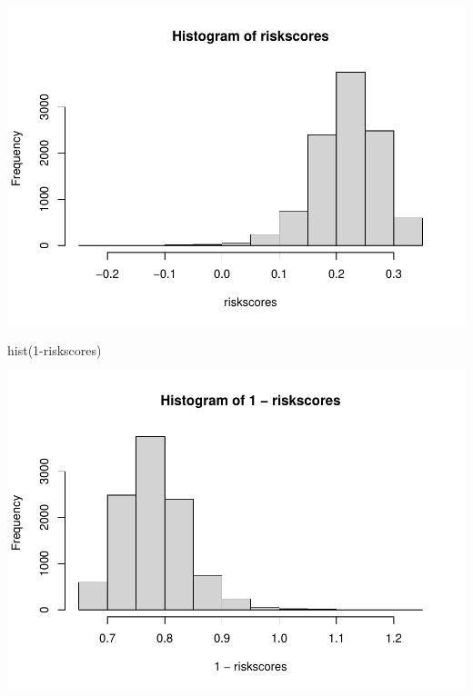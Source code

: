 \documentclass[
  11pt,
]{article}
\newenvironment{Shaded}{\begin{snugshade}}{\end{snugshade}}
\newcommand{\CommentTok}[1]{\textcolor[rgb]{0.56,0.35,0.01}{\textit{#1}}}
\newcommand{\DecValTok}[1]{\textcolor[rgb]{0.00,0.00,0.81}{#1}}
\newcommand{\FunctionTok}[1]{\textcolor[rgb]{0.00,0.00,0.00}{#1}}
\newcommand{\NormalTok}[1]{#1}
\newcommand{\OtherTok}[1]{\textcolor[rgb]{0.56,0.35,0.01}{#1}}
\newcommand{\SpecialCharTok}[1]{\textcolor[rgb]{0.00,0.00,0.00}{#1}}
\begin{document}
\begin{Shaded}
\end{Shaded}

\includegraphics{Hazard_and_Risk_plot_updated_files/figure-latex/unnamed-chunk-11-1.pdf}

\begin{Shaded}
\begin{Highlighting}[]
\FunctionTok{hist}\NormalTok{(}\DecValTok{1}\SpecialCharTok{{-}}\NormalTok{riskscores)}
\end{Highlighting}
\end{Shaded}

\includegraphics{Hazard_and_Risk_plot_updated_files/figure-latex/unnamed-chunk-11-2.pdf}
\end{document}
